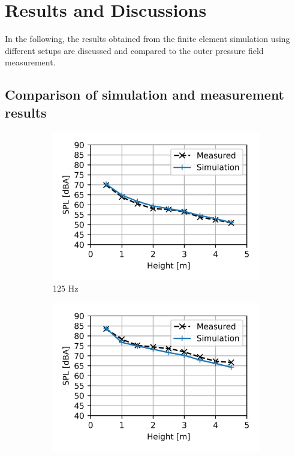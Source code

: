 \chapter{Results and Discussions}
\label{chap:results}

In the following, the results obtained from the finite element simulation using different setups are discussed and compared to the outer pressure field measurement.

\section{Comparison of simulation and measurement results}



\begin{figure}[H]
	\centering
	\begin{subfigure}[b]{0.49\textwidth}
		\centering
		\includegraphics{fig/chap5/initial_model/third_octave_over_height/125_Hz.png}
		\caption{125 Hz}
	\end{subfigure}
	\begin{subfigure}[b]{0.49\textwidth}
		\centering
		\includegraphics{fig/chap5/initial_model/third_octave_over_height/400_Hz.png}

\end{subfigure}
\end{figure}

